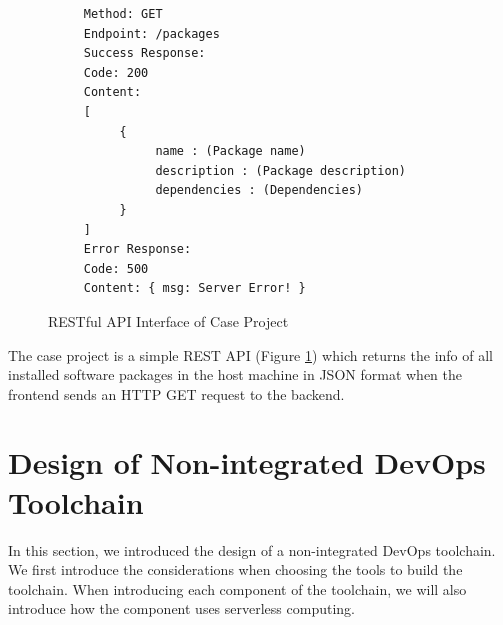 \begin{figure}[!h]
     \begin{verbatim}
     Method: GET
     Endpoint: /packages
     Success Response:
     Code: 200
     Content:
     [
          {
               name : (Package name)
               description : (Package description)
               dependencies : (Dependencies)
          }
     ]
     Error Response:
     Code: 500
     Content: { msg: Server Error! }
     \end{verbatim}
     \caption{RESTful API Interface of Case Project}
     \label{fig:rest}
     \end{figure}
\par
The case project is a simple REST API (Figure \ref{fig:rest}) which returns the info of all installed software packages in the host machine in JSON format when the frontend sends an HTTP GET request to the backend.
\section{Design of Non-integrated DevOps Toolchain}
In this section, we introduced the design of a non-integrated DevOps toolchain. We first introduce the considerations when choosing the tools to build the toolchain. When introducing each component of the toolchain, we will also introduce how the component uses serverless computing.
